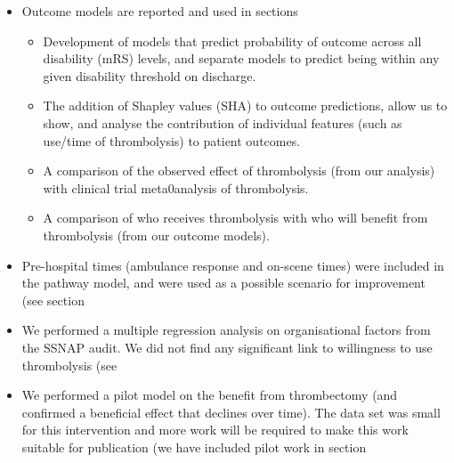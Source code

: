 \begin{itemize}
    \item Outcome models are reported and used in sections %
    \begin{itemize}
        \item Development of models that predict probability of outcome across all disability (mRS) levels, and separate models to predict being within any given disability threshold on discharge.
        \item The addition of Shapley values (SHA) to outcome predictions, allow us to show, and analyse the contribution of individual features (such as use/time of thrombolysis) to patient outcomes.
        \item A comparison of the observed effect of thrombolysis (from our analysis) with clinical trial meta0analysis of thrombolysis.
        \item A comparison of who receives thrombolysis with who will benefit from thrombolysis (from our outcome models).
    \end{itemize}
    \item Pre-hospital times (ambulance response and on-scene times) were included in the pathway model, and were used as a possible scenario for improvement (see section %
    \item We performed a multiple regression analysis on organisational factors from the SSNAP audit. We did not find any significant link to willingness to use thrombolysis (see %
    \item We performed a pilot model on the benefit from thrombectomy (and confirmed a beneficial effect that declines over time). The data set was small for this intervention and more work will be required to make this work suitable for publication (we have included pilot work in section %
\end{itemize}


